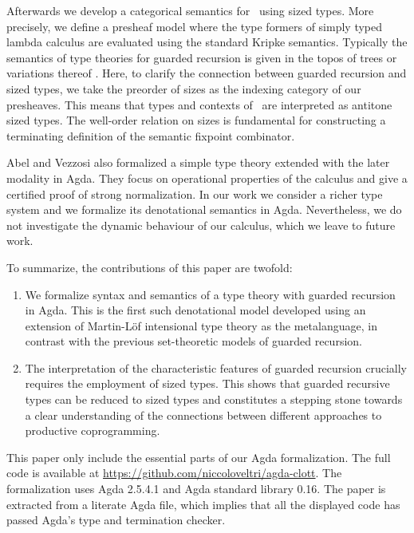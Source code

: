 Afterwards we develop a categorical semantics
for \GTT\ using sized types. More precisely, we define a presheaf
model where the type formers of simply typed lambda calculus are
evaluated using the standard Kripke semantics. Typically the semantics
of type theories for guarded recursion is given in the topos of
trees or variations thereof \cite{BMSS-synthetic,MannaaM18,Mogelberg14}.
Here, to clarify the connection between guarded recursion and
sized types, we take the preorder of sizes as the indexing
category of our presheaves. This means that types and contexts of \GTT\ are
interpreted as antitone sized types. 
The well-order relation on sizes is fundamental for constructing a
terminating definition of the semantic fixpoint combinator. 

Abel and Vezzosi \cite{AbelV14} also formalized a simple type theory
extended with the later modality in Agda. They focus on operational
properties of the calculus and give a certified proof of strong
normalization. In our work we consider a richer type system and we
formalize its denotational semantics in Agda. Nevertheless, we do not
investigate the dynamic behaviour of our calculus, which we leave to
future work.


To summarize, the contributions of this paper are twofold:
\begin{enumerate}
  \item We formalize syntax and semantics of a type theory with
    guarded recursion in Agda. This is the first such denotational model developed using an extension of Martin-L\"of intensional
    type theory as the metalanguage, in contrast with the previous
    set-theoretic models of guarded recursion.
\item The interpretation of the characteristic features of guarded
  recursion crucially requires the employment of sized types. This shows that
  guarded recursive types can be reduced to sized types and
  constitutes a stepping stone towards a clear understanding of  the connections
  between different approaches to productive coprogramming.
\end{enumerate}

This paper only include the essential parts of our Agda
formalization. The full code is available at
\url{https://github.com/niccoloveltri/agda-clott}. The formalization
uses Agda 2.5.4.1 and Agda standard library 0.16. The paper is
extracted from a literate Agda file, which implies that all the
displayed code has passed Agda's type and termination checker.

